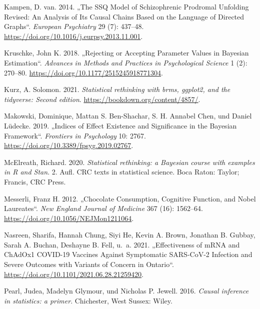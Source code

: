 \documentclass[
  a4paper,
  DIV=11]{scrreprt}
\newlength{\cslhangindent}
\newlength{\cslentryspacingunit} %
\newenvironment{CSLReferences}[2] %
 {%
  \setlength{\parindent}{0pt}
  \ifodd #1
  \let\oldpar\par
  \def\par{\hangindent=\cslhangindent\oldpar}
  \fi
  \setlength{\parskip}{#2\cslentryspacingunit}
 }%
 {}
\theoremstyle{definition}
\theoremstyle{remark}
\begin{document}
\begin{CSLReferences}{1}{0}
\leavevmode{}%
Kampen, D. van. 2014. {„The {SSQ} Model of Schizophrenic Prodromal
Unfolding Revised: An Analysis of Its Causal Chains Based on the
Language of Directed Graphs``}. \emph{European Psychiatry} 29 (7):
437--48. \url{https://doi.org/10.1016/j.eurpsy.2013.11.001}.

\leavevmode{}%
Kruschke, John K. 2018. {„Rejecting or Accepting Parameter Values in
Bayesian Estimation``}. \emph{Advances in Methods and Practices in
Psychological Science} 1 (2): 270--80.
\url{https://doi.org/10.1177/2515245918771304}.

\leavevmode{}%
Kurz, A. Solomon. 2021. \emph{Statistical rethinking with brms, ggplot2,
and the tidyverse: Second edition}.
\url{https://bookdown.org/content/4857/}.

\leavevmode{}%
Makowski, Dominique, Mattan S. Ben-Shachar, S. H. Annabel Chen, und
Daniel Lüdecke. 2019. {„Indices of Effect Existence and Significance in
the Bayesian Framework``}. \emph{Frontiers in Psychology} 10: 2767.
\url{https://doi.org/10.3389/fpsyg.2019.02767}.

\leavevmode{}%
McElreath, Richard. 2020. \emph{Statistical rethinking: a Bayesian
course with examples in R and Stan}. 2. Aufl. {CRC} texts in statistical
science. Boca Raton: Taylor; Francis, {CRC} Press.

\leavevmode{}%
Messerli, Franz H. 2012. {„Chocolate Consumption, Cognitive Function,
and Nobel Laureates``}. \emph{New England Journal of Medicine} 367 (16):
1562--64. \url{https://doi.org/10.1056/NEJMon1211064}.

\leavevmode{}%
Nasreen, Sharifa, Hannah Chung, Siyi He, Kevin A. Brown, Jonathan B.
Gubbay, Sarah A. Buchan, Deshayne B. Fell, u.~a. 2021. {„Effectiveness
of {mRNA} and {ChAdOx}1 {COVID}-19 Vaccines Against Symptomatic
{SARS}-{CoV}-2 Infection and Severe Outcomes with Variants of Concern in
Ontario``}. \url{https://doi.org/10.1101/2021.06.28.21259420}.

\leavevmode{}%
Pearl, Judea, Madelyn Glymour, und Nicholas P. Jewell. 2016.
\emph{Causal inference in statistics: a primer}. Chichester, West
Sussex: Wiley.


\end{CSLReferences}
\end{document}
